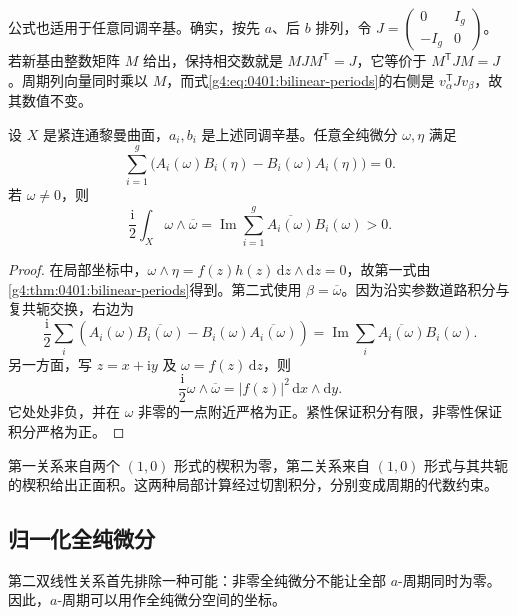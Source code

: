 公式也适用于任意同调辛基。确实，按先 \(a\)、后 \(b\) 排列，令
\(J=\left(\begin{smallmatrix}0&I_g\\-I_g&0\end{smallmatrix}\right)\)。
若新基由整数矩阵 \(M\) 给出，保持相交数就是 \(MJM^{\mathsf T}=J\)，它等价于 \(M^{\mathsf T}JM=J\)。周期列向量同时乘以 \(M\)，而式\eqref{g4:eq:0401:bilinear-periods}的右侧是 \(v_\alpha^{\mathsf T}Jv_\beta\)，故其数值不变。

\begin{theorem}
	\label{g4:thm:0401:riemann-relations}
	设 \(X\) 是紧连通黎曼曲面，\(a_i,b_i\) 是上述同调辛基。任意全纯微分 \(\omega,\eta\) 满足
	\begin{equation}\label{g4:eq:0401:first-riemann}
		\sum_{i=1}^g
		\bigl(A_i(\omega)B_i(\eta)-B_i(\omega)A_i(\eta)\bigr)=0.
	\end{equation}
	若 \(\omega\ne0\)，则
	\begin{equation}\label{g4:eq:0401:second-riemann}
		\frac{\mathrm{i}}2\int_X\omega\wedge\overline\omega
		=\operatorname{Im}\sum_{i=1}^g
		\overline{A_i(\omega)}B_i(\omega)>0.
	\end{equation}
\end{theorem}
\begin{proof}
	在局部坐标中，\(\omega\wedge\eta=f(z)h(z)\,\mathrm{d}z\wedge\mathrm{d}z=0\)，故第一式由\cref{g4:thm:0401:bilinear-periods}得到。第二式使用 \(\beta=\overline\omega\)。因为沿实参数道路积分与复共轭交换，右边为
	\[
		\frac{\mathrm{i}}2\sum_i
		\left(A_i(\omega)\overline{B_i(\omega)}
		-B_i(\omega)\overline{A_i(\omega)}\right)
		=\operatorname{Im}\sum_i\overline{A_i(\omega)}B_i(\omega).
	\]
	另一方面，写 \(z=x+\mathrm{i}y\) 及 \(\omega=f(z)\,\mathrm{d}z\)，则
	\[
		\frac{\mathrm{i}}2\omega\wedge\overline\omega
		=|f(z)|^2\,\mathrm{d}x\wedge\mathrm{d}y.
	\]
	它处处非负，并在 \(\omega\) 非零的一点附近严格为正。紧性保证积分有限，非零性保证积分严格为正。
\end{proof}

第一关系来自两个 \((1,0)\) 形式的楔积为零，第二关系来自 \((1,0)\) 形式与其共轭的楔积给出正面积。这两种局部计算经过切割积分，分别变成周期的代数约束。

\subsection{归一化全纯微分}
\label{g4:subsec:0401:03}

第二双线性关系首先排除一种可能：非零全纯微分不能让全部 \(a\)-周期同时为零。因此，\(a\)-周期可以用作全纯微分空间的坐标。

